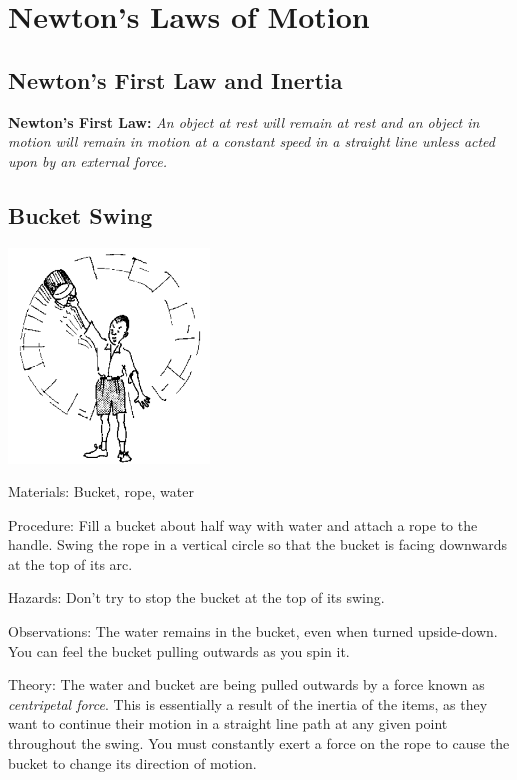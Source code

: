 \section{Newton's Laws of Motion}  

\begin{multicols}{2}


\section*{Newton's First Law and Inertia}  
\textbf{Newton's First Law: }\emph{An object at rest will remain at rest and an object in motion will remain in motion at a constant speed in a straight line unless acted upon by an external force.}

\subsection{Bucket Swing}

\begin{center}
\includegraphics[width=0.4\textwidth]{./img/source/bucket-swing.png}
\end{center}

\begin{description*}
\item[Materials:]{Bucket, rope, water}
\item[Procedure:]{Fill a bucket about half way with water and attach a rope to the handle. Swing the rope in a vertical circle so that the bucket is facing downwards at the top of its arc.}
\item[Hazards:]{Don't try to stop the bucket at the top of its swing.}
\item[Observations:]{The water remains in the bucket, even when turned upside-down. You can feel the bucket pulling outwards as you spin it.}
\item[Theory:]{The water and bucket are being pulled outwards by a force known as \emph{centripetal force}. This is essentially a result of the inertia of the items, as they want to continue their motion in a straight line path at any given point throughout the swing. You must constantly exert a force on the rope to cause the bucket to change its direction of motion.}
\end{description*}


\end{multicols}
